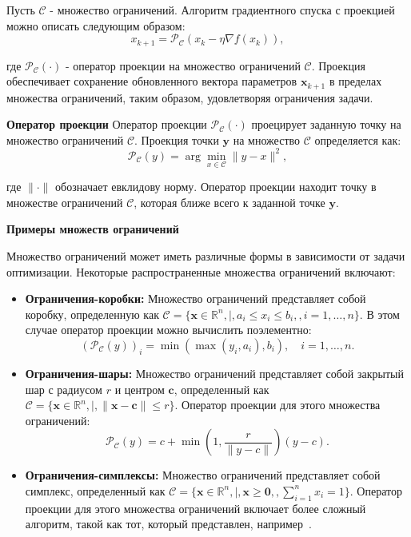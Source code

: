Пусть $\mathcal{C}$ - множество ограничений.
Алгоритм градиентного спуска с проекцией
можно описать следующим образом:
\[ x_{k+1} = \mathcal{P}_{\mathcal{C}}(x_k - \eta \nabla f(x_k)), \]

где $\mathcal{P}_{\mathcal{C}}(\cdot)$ - оператор проекции
на множество ограничений $\mathcal{C}$.
Проекция обеспечивает сохранение обновленного
вектора параметров $\mathbf{x}_{k+1}$ в пределах множества
ограничений, таким образом, удовлетворяя ограничения задачи.

\textbf{Оператор проекции}
Оператор проекции $\mathcal{P}_{\mathcal{C}}(\cdot)$
проецирует заданную точку на множество ограничений $\mathcal{C}$.
Проекция точки $\mathbf{y}$ на множество $\mathcal{C}$ определяется как:
\[
    \mathcal{P}_{\mathcal{C}}(y) =
    \arg \min_{x \in \mathcal{C}} \|y - x\|^2,
\]

где $\|\cdot\|$ обозначает евклидову норму.
Оператор проекции находит точку в множестве ограничений
$\mathcal{C}$, которая ближе всего к заданной точке $\mathbf{y}$.

\textbf{Примеры множеств ограничений}

Множество ограничений может иметь различные формы
в зависимости от задачи оптимизации.
Некоторые распространенные множества ограничений включают:
\begin{itemize}
    \item \textbf{Ограничения-коробки:} Множество ограничений представляет
    собой коробку, определенную как
    $\mathcal{C} = \{\mathbf{x} \in \mathbb{R}^n , | , a_i
    \leq x_i \leq b_i, , i=1,\dots,n\}$.
    В этом случае оператор проекции можно вычислить поэлементно:
    \[
        (\mathcal{P}_{\mathcal{C}}(y))_i =
        \min(\max(y_i, a_i), b_i), \quad i=1,\dots,n.
    \]

    \item \textbf{Ограничения-шары:} Множество ограничений представляет
    собой закрытый шар с радиусом $r$ и центром $\mathbf{c}$,
    определенный как $\mathcal{C} = \{\mathbf{x} \in \mathbb{R}^n , | ,
    \|\mathbf{x} - \mathbf{c}\| \leq r\}$.
    Оператор проекции для этого множества ограничений:
    \[
        \mathcal{P}_{\mathcal{C}}(y) = c
        + \min\left(1, \frac{r}{\|y-c\|}\right)(y-c).
    \]
    \item \textbf{Ограничения-симплексы:} Множество ограничений
    представляет собой симплекс, определенный как
    $\mathcal{C} = \{\mathbf{x} \in \mathbb{R}^n ,
    | , \mathbf{x} \geq \mathbf{0}, , \sum_{i=1}^n x_i = 1\}$.
    Оператор проекции для этого множества ограничений включает
    более сложный алгоритм, такой как тот,
    который представлен, например~\cite{Duchi2011}.
\end{itemize}

